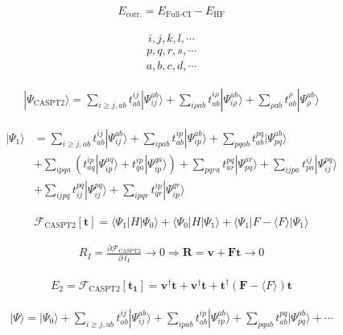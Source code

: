 \documentclass[11pt,pra,aps]{revtex4}
\begin{document}
\begin{align}
  E_\text{corr.}=E_\text{Full-CI}-E_\text{HF}
\end{align}

\begin{align}
  i,j,k,l,\cdots
\end{align}
\begin{align}
  p,q,r,s,\cdots
\end{align}
\begin{align}
  a,b,c,d,\cdots
\end{align}

\begin{align}
  |\Psi_\text{CASPT2}\rangle=\sum_{i\geq j,ab}t_{ab}^{ij}|\Psi_{ij}^{ab}\rangle+\sum_{i\rho ab}t_{ab}^{i\rho}|\Psi_{i\rho}^{ab}\rangle+\sum_{\rho ab}t_{ab}^{\rho}|\Psi_{\rho}^{ab}\rangle
\end{align}

\begin{align}
  |\Psi_1\rangle&=\sum_{i\geq j,ab}t_{ab}^{ij}|\Psi_{ij}^{ab}\rangle+\sum_{ip ab}t_{ab}^{ip}|\Psi_{ip}^{ab}\rangle+\sum_{pq ab}t_{ab}^{pq}|\Psi_{pq}^{ab}\rangle \\
  &+\sum_{ipqa}\left(t^{ip}_{aq}|\Psi_{ip}^{aq}\rangle+t^{ip}_{qa}|\Psi_{ip}^{qa}\rangle\right)+\sum_{pqra}t_{ar}^{pq}|\Psi_{pq}^{ar}\rangle+\sum_{ijpa}t_{pa}^{ij}|\Psi_{ij}^{pq}\rangle \\
  &+\sum_{ijpq}t_{ij}^{pq}|\Psi_{ij}^{pq}\rangle+\sum_{ipqr}t_{qr}^{ip}|\Psi_{ip}^{qr}\rangle
\end{align}

\begin{align}
  \mathscr{F}_\text{CASPT2}[\mathbf{t}]=\langle\Psi_1|H|\Psi_0\rangle+\langle\Psi_0|H|\Psi_1\rangle+\langle\Psi_1|F-\langle F\rangle|\Psi_1\rangle
\end{align}

\begin{align}
  R_I=\frac{\partial \mathscr{F}_\text{CASPT2}}{\partial\ t_I}\rightarrow 0\Rightarrow \mathbf{R}=\mathbf{v}+\mathbf{F}\mathbf{t}\rightarrow 0
\end{align}

\begin{align}
  E_2 = \mathscr{F}_\text{CASPT2}[\mathbf{t_1}]=\mathbf{v}^\dagger\mathbf{t}+\mathbf{v}^\dagger\mathbf{t}+\mathbf{t}^\dagger(\mathbf{F}-\langle F\rangle)\mathbf{t}
\end{align}

\begin{align}
|\Psi\rangle=|\Psi_0\rangle+\sum_{i\geq j,ab}t_{ab}^{ij}|\Psi_{ij}^{ab}\rangle+\sum_{ip ab}t_{ab}^{ip}|\Psi_{ip}^{ab}\rangle+\sum_{pq ab}t_{ab}^{pq}|\Psi_{pq}^{ab}\rangle+\cdots
\end{align}
\end{document}
